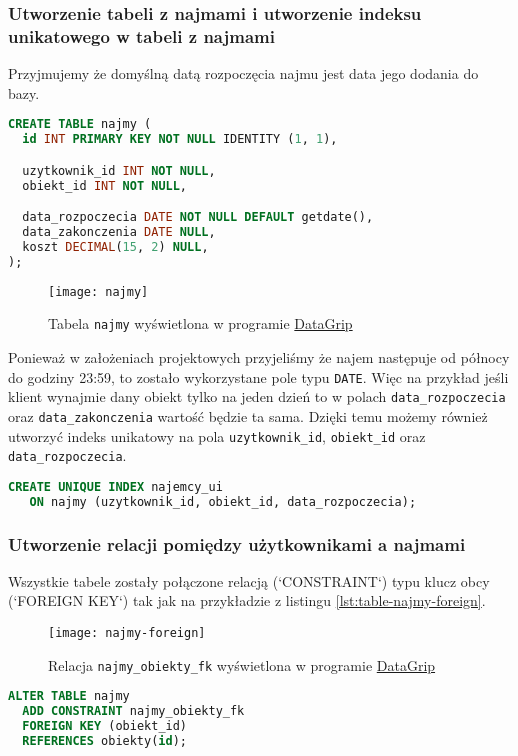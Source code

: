 \subsubsection{Utworzenie tabeli z najmami i utworzenie indeksu unikatowego w tabeli z najmami}

Przyjmujemy że domyślną datą rozpoczęcia najmu jest data jego dodania do bazy.

\begin{lstlisting}[language=SQL, caption={Skrypt tworzący tabelę \texttt{najmy}}, label={lst:table-najmy}]
CREATE TABLE najmy (
  id INT PRIMARY KEY NOT NULL IDENTITY (1, 1),

  uzytkownik_id INT NOT NULL,
  obiekt_id INT NOT NULL,

  data_rozpoczecia DATE NOT NULL DEFAULT getdate(),
  data_zakonczenia DATE NULL,
  koszt DECIMAL(15, 2) NULL,
);
\end{lstlisting}

\begin{figure}[h]
	\centering
    \texttt{[image: najmy]}
	\caption{Tabela \texttt{najmy} wyświetlona w programie \href{https://www.jetbrains.com/datagrip/}{DataGrip}}
	\label{fig:najmy}
\end{figure}

Ponieważ w założeniach projektowych przyjeliśmy że najem następuje od północy do godziny 23:59, to zostało wykorzystane pole typu \texttt{DATE}. Więc na przykład jeśli klient wynajmie dany obiekt tylko na jeden dzień to w polach \texttt{data\_rozpoczecia} oraz \texttt{data\_zakonczenia} wartość będzie ta sama. Dzięki temu możemy również utworzyć indeks unikatowy na pola \texttt{uzytkownik\_id}, \texttt{obiekt\_id} oraz \texttt{data\_rozpoczecia}.

\begin{lstlisting}[language=SQL, caption={Skrypt tworzący indeks unikatowy w tabeli \texttt{obiekty}}, label={lst:table-najmy}]
CREATE UNIQUE INDEX najemcy_ui
   ON najmy (uzytkownik_id, obiekt_id, data_rozpoczecia);
\end{lstlisting}

\subsubsection{Utworzenie relacji pomiędzy użytkownikami a najmami}

Wszystkie tabele zostały połączone relacją (`CONSTRAINT`) typu klucz obcy (`FOREIGN KEY`) tak jak na przykładzie z listingu \ref{lst:table-najmy-foreign}.

\begin{figure}[h]
	\centering
    \texttt{[image: najmy-foreign]}
	\caption{Relacja \texttt{najmy\_obiekty\_fk} wyświetlona w programie \href{https://www.jetbrains.com/datagrip/}{DataGrip}}
	\label{fig:najmy-foreign}
\end{figure}

\begin{lstlisting}[language=SQL, caption={Skrypt tworzący relację \texttt{najmy\_obiekty\_fk}}, label={lst:table-najmy-foreign}]
ALTER TABLE najmy
  ADD CONSTRAINT najmy_obiekty_fk
  FOREIGN KEY (obiekt_id)
  REFERENCES obiekty(id);
\end{lstlisting}